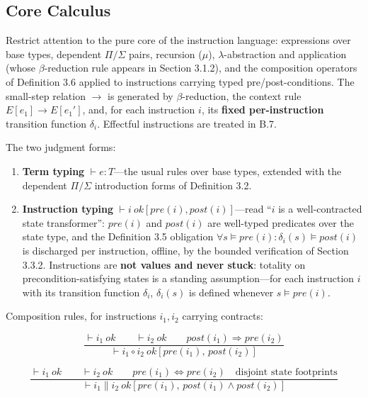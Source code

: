 \documentclass[
  11pt,
]{article}
\begin{document}
\subsection{Core Calculus}\label{core-calculus}

Restrict attention to the pure core of the instruction language:
expressions over base types, dependent \(\Pi/\Sigma\) pairs, recursion
(\(\mu\)), \(\lambda\)-abstraction and application (whose
\(\beta\)-reduction rule appears in Section 3.1.2), and the composition
operators of Definition 3.6 applied to instructions carrying typed
pre/post-conditions. The small-step relation \(\rightarrow\) is
generated by \(\beta\)-reduction, the context rule
\(E[e_1] \rightarrow E[e_1']\), and, for each instruction \(i\), its
\textbf{fixed per-instruction} transition function \(\delta_i\).
Effectful instructions are treated in B.7.

The two judgment forms:

\begin{enumerate}
\def\labelenumi{(\roman{enumi})}
\item
  \textbf{Term typing} \(\vdash e : T\)---the usual rules over base
  types, extended with the dependent \(\Pi/\Sigma\) introduction forms
  of Definition 3.2.
\item
  \textbf{Instruction typing}
  \(\vdash i\ \mathit{ok}[pre(i), post(i)]\)---read ``\(i\) is a
  well-contracted state transformer'': \(pre(i)\) and \(post(i)\) are
  well-typed predicates over the state type, and the Definition 3.5
  obligation \(\forall s \models pre(i): \delta_i(s) \models post(i)\)
  is discharged per instruction, offline, by the bounded verification of
  Section 3.3.2. Instructions are \textbf{not values and never stuck}:
  totality on precondition-satisfying states is a standing
  assumption---for each instruction \(i\) with its transition function
  \(\delta_i\), \(\delta_i(s)\) is defined whenever
  \(s \models pre(i)\).
\end{enumerate}

Composition rules, for instructions \(i_1, i_2\) carrying contracts:

\[\frac{\vdash i_1\ \mathit{ok} \qquad \vdash i_2\ \mathit{ok} \qquad post(i_1) \Rightarrow pre(i_2)}{\vdash i_1 \circ i_2\ \mathit{ok}[pre(i_1),\, post(i_2)]}\]

\[\frac{\vdash i_1\ \mathit{ok} \qquad \vdash i_2\ \mathit{ok} \qquad pre(i_1) \Leftrightarrow pre(i_2) \quad \text{disjoint state footprints}}{\vdash i_1 \parallel i_2\ \mathit{ok}[pre(i_1),\, post(i_1) \wedge post(i_2)]}\]
\end{document}
